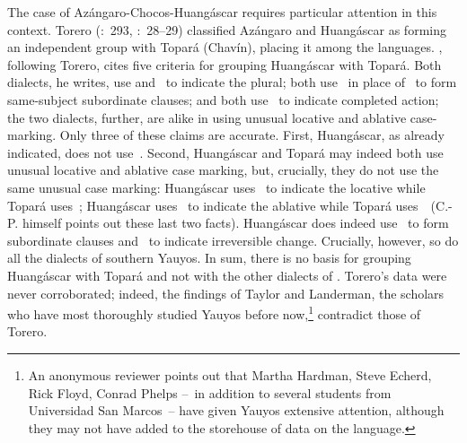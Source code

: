 The case of Azángaro-Chocos-Huangáscar requires particular attention in this context. Torero (\citeyear{Torero68}:~293, \citeyear{Torero74}:~28--29) classified Azángaro and Huangáscar as forming an independent group with Topará (Chavín), placing it among the \QI{}  languages. \citet[236]{CerroP87}, following Torero, cites five criteria for grouping Huangáscar with Topará. Both dialects, he writes, use  and~ to indicate the plural; both use~ in place of~ to form same-subject subordinate clauses; and both use~ to indicate completed action; the two dialects, further, are alike in using unusual locative and ablative case-marking. Only three of these claims are accurate. First, Huangáscar, as \citet{Taylor84} already indicated, does not use~. Second, Huangáscar and Topará may indeed both use unusual locative and ablative case marking, but, crucially, they do not use the same unusual case marking: Huangáscar uses~ to indicate the locative while Topará uses~; Huangáscar uses~ to indicate the ablative while Topará uses~~(C.-P. himself points out these last two facts). Huangáscar does indeed use~ to form subordinate clauses and~ to indicate irreversible change. Crucially, however, so do all the dialects of southern Yauyos. In sum, there is no basis for grouping Huangáscar with Topará and not with the other dialects of \SYQ. Torero’s data were never corroborated; indeed, the findings of Taylor and Landerman, the scholars who have most thoroughly studied Yauyos before now,\footnote{An anonymous reviewer points out that Martha Hardman, Steve Echerd, Rick Floyd, Conrad Phelps --~in addition to several students from Universidad San Marcos~-- have given Yauyos extensive attention, although they may not have added to the storehouse of data on the language.} contradict those of Torero.

